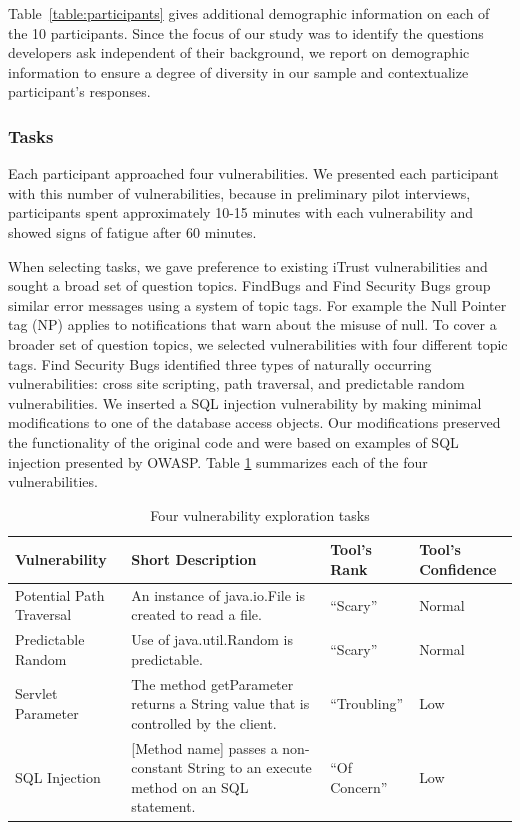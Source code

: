\documentclass[conference]{IEEEtran}
\begin{document}
Table~\ref{table:participants} gives additional demographic information on each of the 10 participants. 
Since the focus of our study was to identify the questions developers ask independent of their background, we report on demographic information to ensure a degree of diversity in our sample and contextualize participant's responses.

\subsubsection{Tasks}
Each participant approached four vulnerabilities. 
We presented each participant with this number of vulnerabilities, because in preliminary pilot interviews, participants spent approximately 10-15 minutes with each vulnerability and showed signs of fatigue after 60 minutes.

When selecting tasks, we gave preference to existing iTrust vulnerabilities and sought a broad set of question topics.  
FindBugs and Find Security Bugs group similar error messages using a system of topic tags. For example the Null Pointer tag (NP) applies to notifications that warn about the misuse of null. 
To cover a broader set of question topics, we selected vulnerabilities with four different topic tags.
Find Security Bugs identified three types of naturally occurring vulnerabilities: cross site scripting, path traversal, and predictable random vulnerabilities.
We inserted a SQL injection vulnerability by making minimal modifications to one of the database access objects.
Our modifications preserved the functionality of the original code and were based on examples of SQL injection presented by OWASP.
Table \ref{table:vulnerabilities} summarizes each of the four vulnerabilities. 

\begin{table} 
\centering
\caption{Four vulnerability exploration tasks}
\begin{tabular}{|l|l|l|l|}
\rowcolor{gray!50}
\hline
    Vulnerability				& Short Description													& Tool's Rank 						& Tool's Confidence\\
    \hline	
    Potential Path Traversal	& An instance of java.io.File is created to read a file.     			& ``Scary''							 	&  Normal\\
    \hline
    Predictable Random			& Use of java.util.Random is predictable. 								& ``Scary''								&  Normal\\
    \hline
    Servlet Parameter 			& The method getParameter returns a String value that is controlled by the client.			& ``Troubling''		&  Low\\
    \hline
    SQL Injection				& [Method name] passes a non-constant String to an execute method on an SQL statement.     	& ``Of Concern''		&  Low\\
    \hline
\end{tabular}
\label{table:vulnerabilities}
\end{table}
\end{document}
